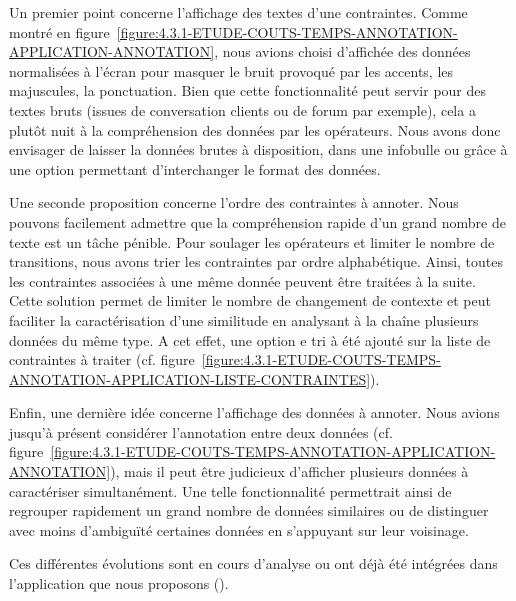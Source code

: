			Un premier point concerne l'affichage des textes d'une contraintes.
			Comme montré en figure~\ref{figure:4.3.1-ETUDE-COUTS-TEMPS-ANNOTATION-APPLICATION-ANNOTATION}, nous avions choisi d'affichée des données normalisées à l'écran pour masquer le bruit provoqué par les accents, les majuscules, la ponctuation.
			Bien que cette fonctionnalité peut servir pour des textes bruts (issues de conversation clients ou de forum par exemple), cela a plutôt nuit à la compréhension des données par les opérateurs.
			Nous avons donc envisager de laisser la données brutes à disposition, dans une infobulle ou grâce à une option permettant d'interchanger le format des données.
			
			Une seconde proposition concerne l'ordre des contraintes à annoter.
			Nous pouvons facilement admettre que la compréhension rapide d'un grand nombre de texte est un tâche pénible.
			Pour soulager les opérateurs et limiter le nombre de transitions, nous avons trier les contraintes par ordre alphabétique.
			Ainsi, toutes les contraintes associées à une même donnée peuvent être traitées à la suite.
			Cette solution permet de limiter le nombre de changement de contexte et peut faciliter la caractérisation d'une similitude en analysant à la chaîne plusieurs données du même type.
			A cet effet, une option e tri à été ajouté sur la liste de contraintes à traiter (cf. figure~\ref{figure:4.3.1-ETUDE-COUTS-TEMPS-ANNOTATION-APPLICATION-LISTE-CONTRAINTES}).

			Enfin, une dernière idée concerne l'affichage des données à annoter.
			Nous avions jusqu'à présent considérer l'annotation entre deux données (cf. figure~\ref{figure:4.3.1-ETUDE-COUTS-TEMPS-ANNOTATION-APPLICATION-ANNOTATION}), mais il peut être judicieux d'afficher plusieurs données à caractériser simultanément.
			Une telle fonctionnalité permettrait ainsi de regrouper rapidement un grand nombre de données similaires ou de distinguer avec moins d'ambiguïté certaines données en s'appuyant sur leur voisinage.
			
			\begin{leftBarInformation}
				Ces différentes évolutions sont en cours d'analyse ou ont déjà été intégrées dans l'application que nous proposons (\cite{schild-etal:2022:cognitivefactory-interactiveclusteringgui}).
			\end{leftBarInformation}
	

